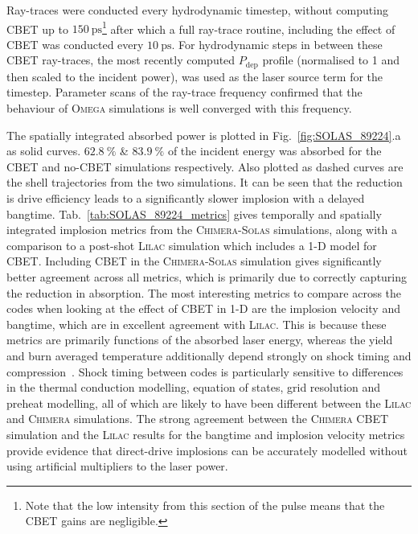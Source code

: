 Ray-traces were conducted every hydrodynamic timestep, without computing \ac{CBET} up to $150\ \text{ps}$\footnote{Note that the low intensity from this section of the pulse means that the \ac{CBET} gains are negligible.} after which a full ray-trace routine, including the effect of \ac{CBET} was conducted every $10\ \text{ps}$.
For hydrodynamic steps in between these \ac{CBET} ray-traces, the most recently computed $P_{\text{dep}}$ profile (normalised to 1 and then scaled to the incident power), was used as the laser source term for the timestep.
Parameter scans of the ray-trace frequency confirmed that the behaviour of \textsc{Omega} simulations is well converged with this frequency.

The spatially integrated absorbed power is plotted in Fig.~\ref{fig:SOLAS_89224}.a as solid curves.
$62.8\ \%$ \& $83.9\ \%$ of the incident energy was absorbed for the \ac{CBET} and no-\ac{CBET} simulations respectively.
Also plotted as dashed curves are the shell trajectories from the two simulations.
It can be seen that the reduction is drive efficiency leads to a significantly slower implosion with a delayed bangtime.
Tab.~\ref{tab:SOLAS_89224_metrics} gives temporally and spatially integrated implosion metrics from the \textsc{Chimera}-\textsc{Solas} simulations, along with a comparison to a post-shot \textsc{Lilac} simulation which includes a 1-D model for \ac{CBET}.
Including \ac{CBET} in the \textsc{Chimera}-\textsc{Solas} simulation gives significantly better agreement across all metrics, which is primarily due to correctly capturing the reduction in absorption.
The most interesting metrics to compare across the codes when looking at the effect of \ac{CBET} in 1-D are the implosion velocity and bangtime, which are in excellent agreement with \textsc{Lilac}.
This is because these metrics are primarily functions of the absorbed laser energy, whereas the yield and burn averaged temperature additionally depend strongly on shock timing and compression~\cite{zhou_hydrodynamic_2007,trickey_physics_2024}.
Shock timing between codes is particularly sensitive to differences in the thermal conduction modelling, equation of states, grid resolution and preheat modelling, all of which are likely to have been different between the \textsc{Lilac} and \textsc{Chimera} simulations.
The strong agreement between the \textsc{Chimera} \ac{CBET} simulation and the \textsc{Lilac} results for the bangtime and implosion velocity metrics provide evidence that direct-drive implosions can be accurately modelled without using artificial multipliers to the laser power.

